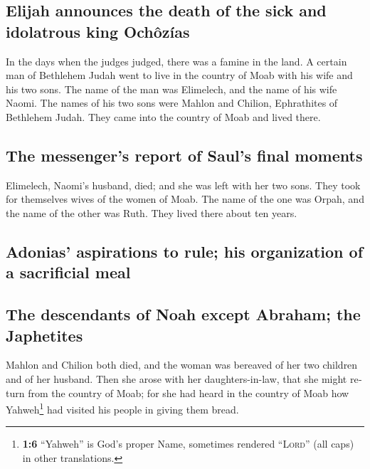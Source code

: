 \begin{paracol}{2}
\begin{otherlanguage}{english}
\hypertarget{elijah-announces-the-death-of-the-sick-and-idolatrous-king-ochuxf4zuxedas}{%
\subsection{Elijah announces the death of the sick and idolatrous king
Ochôzías}\label{elijah-announces-the-death-of-the-sick-and-idolatrous-king-ochuxf4zuxedas}}

 In the days when the judges judged, there was a famine in
the land. A certain man of Bethlehem Judah went to live in the country
of Moab with his wife and his two sons.  The name of the
man was Elimelech, and the name of his wife Naomi. The names of his two
sons were Mahlon and Chilion, Ephrathites of Bethlehem Judah. They came
into the country of Moab and lived there.

\hypertarget{the-messengers-report-of-sauls-final-moments}{%
\subsection{The messenger's report of Saul's final
moments}\label{the-messengers-report-of-sauls-final-moments}}

 Elimelech, Naomi's husband, died; and she was left with
her two sons.  They took for themselves wives of the women
of Moab. The name of the one was Orpah, and the name of the other was
Ruth. They lived there about ten years.

\hypertarget{adonias-aspirations-to-rule-his-organization-of-a-sacrificial-meal}{%
\subsection{Adonias' aspirations to rule; his organization of a
sacrificial
meal}\label{adonias-aspirations-to-rule-his-organization-of-a-sacrificial-meal}}

\hypertarget{the-descendants-of-noah-except-abraham-the-japhetites}{%
\subsection{The descendants of Noah except Abraham; the
Japhetites}\label{the-descendants-of-noah-except-abraham-the-japhetites}}

 Mahlon and Chilion both died, and the woman was bereaved
of her two children and of her husband.  Then she arose
with her daughters-in-law, that she might return from the country of
Moab; for she had heard in the country of Moab how Yahweh\footnote{\textbf{1:6}
  ``Yahweh'' is God's proper Name, sometimes rendered ``\textsc{Lord}''
  (all caps) in other translations.} had visited his people in giving
them bread.


\end{otherlanguage}
\end{paracol}
